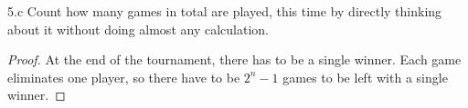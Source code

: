 \begin{exercise}{5.c}
Count how many games in total are played, this time by directly thinking about it
without doing almost any calculation.
\end{exercise}

\begin{proof}
        At the end of the tournament, there has to be a single winner. Each game eliminates one player, so there have to be $2^n-1$ games to be left with a single winner.
\end{proof}

